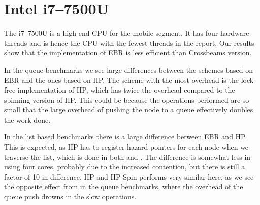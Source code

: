 \documentclass[b5paper]{report}
\begin{document}
\newcommand{\benches}[2]{
  \begin{figure}[ht]
    \centering
    \begin{subfigure}{0.49\textwidth}
      \centering \footnotesize\code{Queue::Pop}
      \texttt{[image: plots/\#1-b:queue\_pop.pdf]}
    \end{subfigure}
    \begin{subfigure}{0.49\textwidth}
      \centering \footnotesize\code{Queue::Transfer}
      \texttt{[image: plots/\#1-b:queue\_transfer.pdf]}
    \end{subfigure}
    \\\vspace{0.25cm}
    \begin{subfigure}{0.49\textwidth}
      \centering \footnotesize\code{List::Remove}
      \texttt{[image: plots/\#1-b:list\_remove.pdf]}
    \end{subfigure}
    \begin{subfigure}{0.49\textwidth}
      \centering \footnotesize\code{List::Real}
      \texttt{[image: plots/\#1-b:list\_real.pdf]}
    \end{subfigure}
    \caption{Benchmarks relative to no memory reclamation for the #2}
  \end{figure}
}

\clearpage
\section{Intel\textregistered{} i7--7500U}

The i7--7500U is a high end CPU for the mobile segment. It has four hardware
threads and is hence the CPU with the fewest threads in the report. Our results
show that the implementation of EBR is less efficient than Crossbeams version.

In the queue benchmarks we see large differences between the schemes based on
EBR and the ones based on HP\@. The scheme with the most overhead is the
lock-free implementation of HP, which has twice the overhead compared to the
spinning version of HP\@. This could be because the operations performed are so
small that the large overhead of pushing the node to a queue effectively doubles
the work done.

In the list based benchmarks there is a large difference between EBR and HP\@.
This is expected, as HP has to register hazard pointers for each node when we
traverse the list, which is done in both  and . The
difference is somewhat less in  using four cores, probably due to the
increased contention, but there is still a factor of 10 in difference. HP and
HP-Spin performs very similar here, as we see the opposite effect from in the
queue benchmarks, where the overhead of the queue push drowns in the slow
operations.
\end{document}
